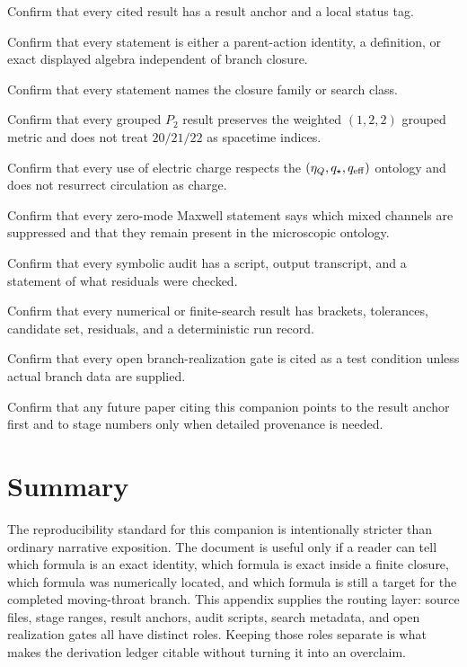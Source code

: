 \begin{verificationchecklist}
\item Confirm that every cited result has a result anchor and a local status tag.
\item Confirm that every \StatusExact{} statement is either a parent-action identity, a definition, or exact displayed algebra independent of branch closure.
\item Confirm that every \StatusExactClosure{} statement names the closure family or search class.
\item Confirm that every grouped \(P_2\) result preserves the weighted \((1,2,2)\) grouped metric and does not treat \(20/21/22\) as spacetime indices.
\item Confirm that every use of electric charge respects the \((\eta_Q,q_\star,q_{\rm eff})\) ontology and does not resurrect circulation as charge.
\item Confirm that every zero-mode Maxwell statement says which mixed channels are suppressed and that they remain present in the microscopic ontology.
\item Confirm that every symbolic audit has a script, output transcript, and a statement of what residuals were checked.
\item Confirm that every numerical or finite-search result has brackets, tolerances, candidate set, residuals, and a deterministic run record.
\item Confirm that every open branch-realization gate is cited as a test condition unless actual branch data are supplied.
\item Confirm that any future paper citing this companion points to the result anchor first and to stage numbers only when detailed provenance is needed.
\end{verificationchecklist}

\section{Summary}
\label{sec:reproducibility-summary}

The reproducibility standard for this companion is intentionally stricter than ordinary narrative exposition.  The document is useful only if a reader can tell which formula is an exact identity, which formula is exact inside a finite closure, which formula was numerically located, and which formula is still a target for the completed moving-throat branch.  This appendix supplies the routing layer: source files, stage ranges, result anchors, audit scripts, search metadata, and open realization gates all have distinct roles.  Keeping those roles separate is what makes the derivation ledger citable without turning it into an overclaim.
